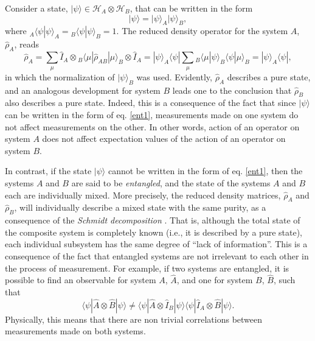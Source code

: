 \documentclass[
12pt,		%
openright,	%
twoside,  %
a4paper,			%
chapter=TITLE,		%
english,			%
french,				%
spanish,			%
brazil				%
]{USPSC-classe/USPSC}
\begin{document}
\begin{apendicesenv}
Consider a state, $|\psi\rangle\in\mathscr{H}_A\otimes\mathscr{H}_B$, that can be written in the form
\begin{equation}\label{ent1}
    |\psi\rangle=|\psi\rangle_A|\psi\rangle_B,
\end{equation}
where ${}_A\langle\psi|\psi\rangle_A={}_B\langle\psi|\psi\rangle_B=1$. The reduced density operator for the system $A$, $\hat{\rho}_A$, reads
\begin{equation}
     \hat{\rho}_A=\sum_{\mu}\hat{I}_A\otimes{}_B\langle\mu|\hat{\rho}_{AB}|\mu\rangle_B\otimes\hat{I}_A=|\psi\rangle_A\langle\psi|\sum_{\mu}{}_B\langle\mu|\psi\rangle_B\langle\psi|\mu\rangle_B=|\psi\rangle_A\langle\psi|,
\end{equation}
in which the normalization of $|\psi\rangle_B$ was used. Evidently, $\hat{\rho}_A$ describes a pure state, and an analogous development for system $B$ leads one to the conclusion that $\hat{\rho}_B$ also describes a pure state. Indeed, this is a consequence of the fact that since $|\psi\rangle$ can be written in the form of eq. \ref{ent1}, measurements made on one system do not affect measurements on the other. In other words, action of an operator on system $A$ does not affect expectation values of the action of an operator on system $B$. 

In contrast, if the state $|\psi\rangle$ cannot be written in the form of eq. \ref{ent1}, then the systems $A$ and $B$ are said to be \textit{entangled}, and the state of the systems $A$ and $B$ each are individually mixed. More precisely, the reduced density matrices, $\hat{\rho}_A$ and $\hat{\rho}_B$, will individually describe a mixed state with the same purity, as a consequence of the \textit{Schmidt decomposition} \cite{Nielsen2010}. That is, although the total state of the composite system is completely known (i.e., it is described by a pure state), each individual subsystem has the same degree of ``lack of information''. This is a consequence of the fact that entangled systems are not irrelevant to each other in the process of measurement. For example, if two systems are entangled, it is possible to find an observable for system $A$, $\hat{A}$, and one for system $B$, $\hat{B}$, such that \cite{Unruh2017}
\begin{equation}\label{ent}
    \langle\psi|\hat{A}\otimes\hat{B}|\psi\rangle\neq\langle\psi|\hat{A}\otimes\hat{I}_B|\psi\rangle\langle\psi|\hat{I}_A\otimes\hat{B}|\psi\rangle.
\end{equation}
Physically, this means that there are non trivial correlations between measurements made on both systems. 


\end{apendicesenv}
\end{document}
